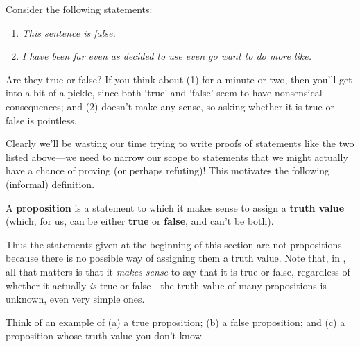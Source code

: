 
Consider the following statements:

\begin{enumerate}[(1)]
\item \textit{This sentence is false.}
\item \textit{I have been far even as decided to use even go want to do more like.}
\end{enumerate}

Are they true or false? If you think about (1) for a minute or two, then you'll get into a bit of a pickle, since both `true' and `false' seem to have nonsensical consequences; and (2) doesn't make any sense, so asking whether it is true or false is pointless.

Clearly we'll be wasting our time trying to write proofs of statements like the two listed above---we need to narrow our scope to statements that we might actually have a chance of proving (or perhaps refuting)! This motivates the following (informal) definition.

\begin{definition}
\label{defProposition}
A \textbf{proposition} is a statement to which it makes sense to assign a \textbf{truth value} (which, for us, can be either \textbf{true} or \textbf{false}, and can't be both).
\end{definition}

Thus the statements given at the beginning of this section are not propositions because there is no possible way of assigning them a truth value. Note that, in , all that matters is that it \textit{makes sense} to say that it is true or false, regardless of whether it actually \textit{is} true or false---the truth value of many propositions is unknown, even very simple ones.

\begin{exercise}
\label{exExamplesOfPropositions}
Think of an example of (a) a true proposition; (b) a false proposition; and (c) a proposition whose truth value you don't know.
\end{exercise}

